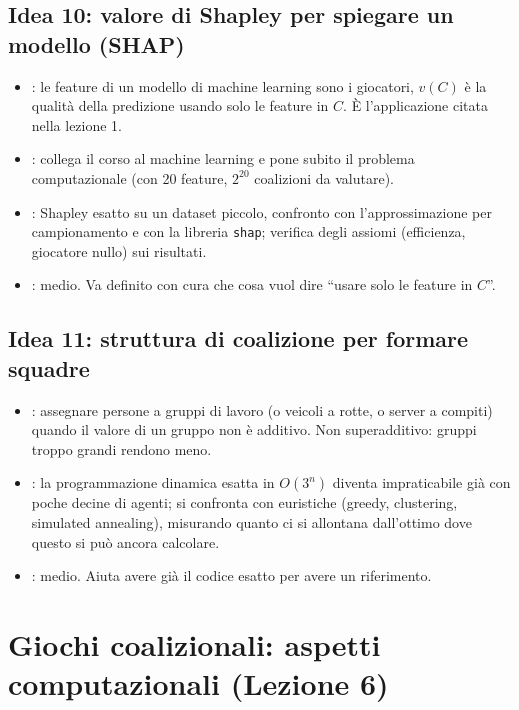 \documentclass[11pt, a4paper, oneside, openany]{book}
\newcommand{\stato}[2]{\etichetta{#1}{#2}}
\newcommand{\sbloccata}[1]{\stato{blu}{DA LEZIONE #1}}
\begin{document}
\subsection*{Idea 10: valore di Shapley per spiegare un modello (SHAP) \hfill\sbloccata{5}}
\begin{itemize}
  \item {}: le feature di un modello di machine learning sono i giocatori, $v(C)$
        è la qualità della predizione usando solo le feature in $C$. È l'applicazione
        citata nella lezione 1.
  \item {}: collega il corso al machine learning e pone subito il
        problema computazionale (con 20 feature, $2^{20}$ coalizioni da valutare).
  \item {}: Shapley esatto su un dataset piccolo, confronto con
        l'approssimazione per campionamento e con la libreria \texttt{shap}; verifica degli
        assiomi (efficienza, giocatore nullo) sui risultati.
  \item {}: medio. Va definito con cura che cosa vuol dire ``usare solo le feature
        in $C$''.
\end{itemize}

\subsection*{Idea 11: struttura di coalizione per formare squadre \hfill\sbloccata{5}}
\begin{itemize}
  \item {}: assegnare persone a gruppi di lavoro (o veicoli a rotte, o server a
        compiti) quando il valore di un gruppo non è additivo. Non superadditivo: gruppi
        troppo grandi rendono meno.
  \item {}: la programmazione dinamica esatta in $O(3^n)$ diventa
        impraticabile già con poche decine di agenti; si confronta con euristiche (greedy,
        clustering, simulated annealing), misurando quanto ci si allontana dall'ottimo
        dove questo si può ancora calcolare.
  \item {}: medio. Aiuta avere già il codice esatto per avere un riferimento.
\end{itemize}

\section{Giochi coalizionali: aspetti computazionali (Lezione 6)}
\end{document}
